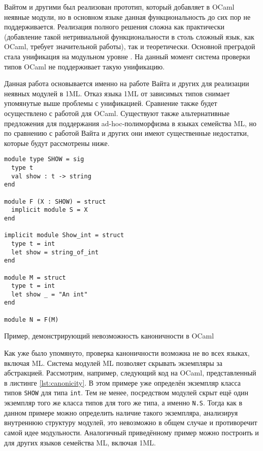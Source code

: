 \documentclass[../diploma.tex]{subfiles}
\begin{document}
Вайтом и другими был реализован прототип, который добавляет в OCaml неявные модули, но в основном языке данная функциональность до сих пор не поддерживается. Реализация полного решения сложна как практически (добавление такой нетривиальной функциональности в столь сложный язык, как OCaml, требует значительной работы), так и теоретически. Основной преградой стала унификация на модульном уровне \cite{discuss}. На данный момент система проверки типов OCaml не поддерживает такую унификацию.

Данная работа основывается именно на работе Вайта и других для реализации неявных модулей в 1ML. Отказ языка 1ML от зависимых типов снимает упомянутые выше проблемы с унификацией. Сравнение также будет осуществлено с работой для OCaml. Существуют также альтернативные предложения для поддержания ad-hoc-полиморфизма в языках семейства ML, но по сравнению с работой Вайта и других они имеют существенные недостатки, которые будут рассмотрены ниже.

\begin{listing}[H]
\begin{verbatim}
module type SHOW = sig
  type t
  val show : t -> string
end

module F (X : SHOW) = struct
  implicit module S = X
end

implicit module Show_int = struct
  type t = int
  let show = string_of_int
end

module M = struct
  type t = int
  let show _ = "An int"
end

module N = F(M)
\end{verbatim}
\caption{Пример, демонстрирующий невозможность каноничности в OCaml}
\label{lst:canonicity}
\end{listing}

Как уже было упомянуто, проверка каноничности возможна не во всех языках, включая ML. Система модулей ML позволяет скрывать экземпляры за абстракцией. Рассмотрим, например, следующий код на OCaml, представленный в листинге \ref{lst:canonicity}. В этом примере уже определён экземпляр класса типов \texttt{SHOW} для типа \texttt{int}. Тем не менее, посредством модулей скрыт ещё один экземпляр того же класса типов для того же типа, а именно \texttt{N.S}. Тогда как в данном примере можно определить наличие такого экземпляра, анализируя внутреннюю структуру модулей, это невозможно в общем случае и противоречит самой идее модульности. Аналогичный приведённому пример можно построить и для других языков семейства ML, включая 1ML.
\end{document}
